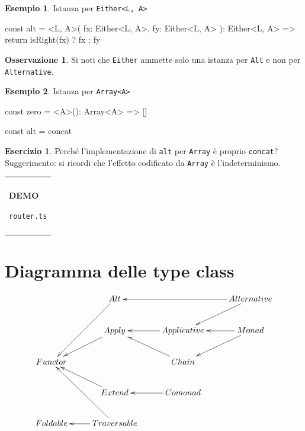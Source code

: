 \documentclass[12pt]{article}
\theoremstyle{definition}
\newtheorem{example}{Esempio}[section]
\newtheorem{exercise}{Esercizio}[section]
\newtheorem{observation}{Osservazione}[section]
\newenvironment{demo}
    {\begin{center}
    \begin{tabular}{|p{0.9\textwidth}|}
    \hline\\
    }
    {
    \\\\\hline
    \end{tabular}
    \end{center}
    }
\newenvironment{code}
  {\vspace{0.5cm} \VerbatimEnvironment\begin{typescriptcode}}
  {\end{typescriptcode} \vspace{0.2cm}}
\begin{document}
\begin{example}
Istanza per \texttt{Either<L, A>}

\begin{code}
const alt = <L, A>(
  fx: Either<L, A>,
  fy: Either<L, A>
): Either<L, A> => {
  return isRight(fx) ? fx : fy
}
\end{code}
\end{example}

\begin{observation}
Si noti che \texttt{Either} ammette solo una istanza per \texttt{Alt} e non per \texttt{Alternative}.
\end{observation}

\begin{example}
Istanza per \texttt{Array<A>}

\begin{code}
const zero = <A>(): Array<A> => []

const alt = concat
\end{code}
\end{example}

\begin{exercise}
Perché l'implementazione di \texttt{alt} per \texttt{Array} è proprio \texttt{concat}?
Suggerimento: si ricordi che l'effetto codificato da \texttt{Array} è l'indeterminismo.
\end{exercise}

\begin{demo}
\begin{center}
\textbf{DEMO}

\texttt{router.ts}
\end{center}
\end{demo}

\newpage

\section{Diagramma delle type class}

\[
\xymatrix{
  & Alt \ar[ldd] & & Alternative \ar[ll] \ar[ld] \\
  & Apply \ar[ld] & Applicative \ar[l] & Monad \ar[l] \ar[ld] \\
  Functor & & Chain \ar[lu] \\
  & Extend \ar[lu] & Comonad \ar[l] \\
  Foldable & Traversable \ar[l] \ar[uul] \\
}
\]

\newpage
\end{document}
